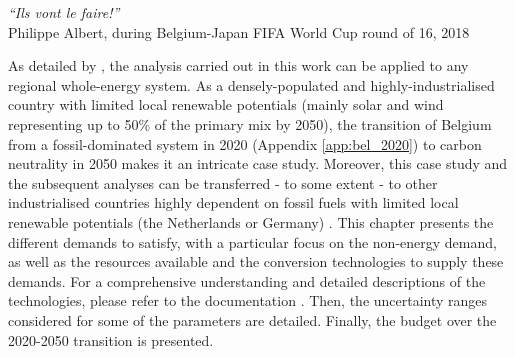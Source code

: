 \vspace{-0.2cm}
\begin{flushright}
\emph{``Ils vont le faire!''}\\
Philippe Albert, during Belgium-Japan FIFA World Cup round of 16, 2018
\end{flushright}
\vspace{0.4cm}
%
%
%

As detailed by \citet{limpens2024pathway}, the analysis carried out in this work can be applied to any regional whole-energy system. As a densely-populated and highly-industrialised country with limited local renewable potentials (\ie mainly solar and wind representing up to 50\% of the primary mix by 2050), the transition of Belgium from a fossil-dominated system in 2020 (Appendix \ref{app:bel_2020}) to carbon neutrality in 2050 makes it an intricate case study. Moreover, this case study and the subsequent analyses can be transferred - to some extent - to other industrialised countries highly dependent on fossil fuels with limited local renewable potentials (\eg the Netherlands or Germany) \cite{dommisse2020modelling}. This chapter presents the different demands to satisfy, with a particular focus on the non-energy demand, as well as the resources available and the conversion technologies to supply these demands. For a comprehensive understanding and detailed descriptions of the technologies, please refer to the documentation \cite{readthedocs_pathway}. Then, the uncertainty ranges considered for some of the parameters are detailed. Finally, the  budget over the 2020-2050 transition is presented.

